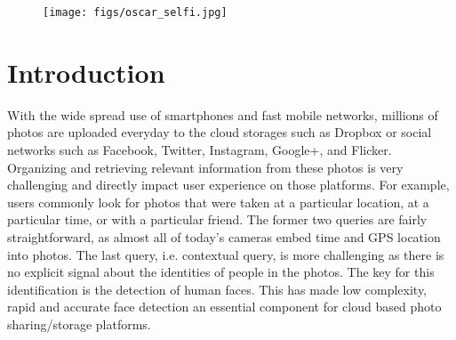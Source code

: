 \documentclass{sig-alternate-2013}
\begin{document}
\begin{figure}[t] 
  \centering
    \texttt{[image: figs/oscar\_selfi.jpg]}
  \caption{}
  \label{fig:challenging_faces}
\end{figure}

\section{Introduction}

With the wide spread use of smartphones and fast mobile networks, millions of photos are uploaded everyday to the cloud storages such as Dropbox or social networks such as Facebook, Twitter, Instagram, Google+, and Flicker. Organizing and retrieving relevant information from these photos is very challenging and directly impact user experience on those platforms. For example, users commonly look for photos that were taken at a particular location, at a particular time, or with a particular friend. The former two queries are fairly straightforward, as almost all of today's cameras embed time and GPS location into photos. The last query, i.e. contextual query, is more challenging as there is no explicit signal about the identities of people in the photos. The key for this identification is the detection of human faces. This has made low complexity, rapid and accurate face detection an essential component for cloud based photo sharing/storage platforms.
\end{document}
